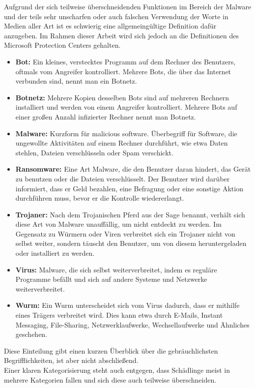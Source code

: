 Aufgrund der sich teilweise überschneidenden Funktionen im Bereich der Malware und der teils sehr unscharfen oder auch falschen Verwendung der Worte in Medien aller Art ist es schwierig eine allgemeingültige Definition dafür anzugeben. Im Rahmen dieser Arbeit wird sich jedoch an die Definitionen des Microsoft Protection Centers \cite{malware_pc} gehalten.

		\begin{itemize}
			\item \textbf{Bot:} Ein kleines, verstecktes Programm auf dem Rechner des Benutzers, oftmals vom Angreifer kontrolliert. Mehrere Bots, die über das Internet verbunden sind, nennt man ein Botnetz.
			\item \textbf{Botnetz:} Mehrere Kopien des­sel­ben Bots sind auf mehreren Rechnern installiert und werden von einem Angreifer kontrolliert. Mehrere Bots auf einer großen Anzahl infizierter Rechner nennt man Botnetz.
			\item \textbf{Malware:}	Kurzform für \glqq malicious software\grqq. Überbegriff für Software, die ungewollte Aktivitäten auf einem Rechner durchführt, wie etwa Daten stehlen, Dateien verschlüsseln oder Spam verschickt.
			\item \textbf{Ransomware:} Eine Art Malware, die den Benutzer daran hindert, das Gerät zu benutzen oder die Dateien verschlüsselt. Der Benutzer wird darüber informiert, dass er Geld bezahlen, eine Befragung oder eine sonstige Aktion durchführen muss, bevor er die Kontrolle wiedererlangt.
			\item \textbf{Trojaner:} Nach dem Trojanischen Pferd aus der Sage benannt, verhält sich diese Art von Malware unauffällig, um nicht entdeckt zu werden. Im Gegensatz zu Würmern oder Viren verbreitet sich ein Trojaner nicht von selbst weiter, sondern täuscht den Benutzer, um von diesem heruntergeladen oder installiert zu werden.
			\item \textbf{Virus:} Malware, die sich selbst weiterverbreitet, indem es reguläre Programme befällt und sich auf andere Systeme und Netzwerke weiterverbreitet.
			\item \textbf{Wurm:} Ein Wurm unterscheidet sich vom Virus dadurch, dass er mithilfe eines Trägers verbreitet wird. Dies kann etwa durch E-Mails, Instant Messaging, File-Sharing, Netzwerklaufwerke, Wechsellaufwerke und Ähnliches geschehen.
		\end{itemize}
Diese Einteilung gibt einen kurzen Überblick über die gebräuchlichsten Begrifflichkeiten, ist aber nicht abschließend. \\
Einer klaren Kategorisierung steht auch entgegen, dass Schädlinge meist in mehrere Kategorien fallen und sich diese auch teilweise überschneiden.